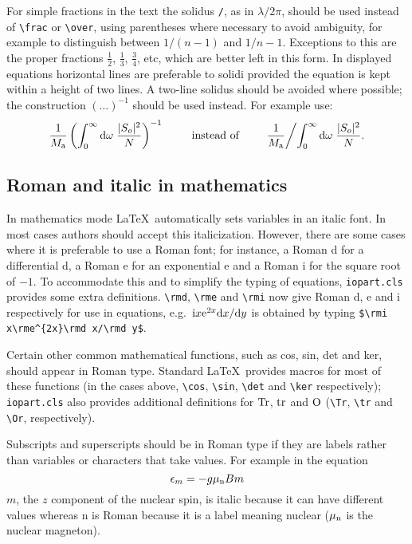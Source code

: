 \documentclass[12pt]{iopart}
\begin{document}
For simple fractions in the text the solidus \verb"/", as in 
$\lambda/2\pi$, should be used instead of \verb"\frac" or \verb"\over", 
using parentheses where necessary to avoid ambiguity, 
for example to distinguish between $1/(n-1)$ and $1/n-1$. Exceptions to 
this are the proper fractions $\frac12$, $\frac13$, $\frac34$, 
etc, which are better left in this form. In displayed equations 
horizontal lines are preferable to solidi provided the equation is 
kept within a height of two lines. A two-line solidus should be 
avoided where possible; the construction $(\ldots)^{-1}$ should be 
used instead. For example use:
\begin{equation*}
\frac{1}{M_{\rm a}}\left(\int^\infty_0{\rm d}
\omega\;\frac{|S_o|^2}{N}\right)^{-1}\qquad\mbox{instead of}\qquad
\frac{1}{M_{\rm a}}\biggl/\int^\infty_0{\rm d}
\omega\;\frac{|S_o|^2}{N}.
\end{equation*}

\subsection{Roman and italic in mathematics}
In mathematics mode \LaTeX\ automatically sets variables in an italic 
font. In most cases authors should accept this italicization. However, 
there are some cases where it is preferable to use a Roman font; for 
instance, a Roman d for a differential d, a Roman e 
for an exponential e and a Roman i for the square root of $-1$. To 
accommodate this and to simplify the  typing of equations, \verb"iopart.cls" provides
some extra definitions. \verb"\rmd", \verb"\rme" and \verb"\rmi" 
now give Roman d, e and i respectively for use in equations, 
e.g.\ $\rmi x\rme^{2x}\rmd x/\rmd y$ 
is obtained by typing \verb"$\rmi x\rme^{2x}\rmd x/\rmd y$". 
 

Certain other common mathematical functions, such as cos, sin, det and 
ker, should appear in Roman type. Standard \LaTeX\ provides macros for 
most of these functions 
(in the cases above, \verb"\cos", \verb"\sin", \verb"\det" and \verb"\ker" 
respectively); \verb"iopart.cls" also provides 
additional definitions for $\Tr$, $\tr$ and 
$\Or$ (\verb"\Tr", \verb"\tr" and \verb"\Or", respectively). 

Subscripts and superscripts should be in Roman type if they are labels 
rather than variables or characters that take values. For example in the 
equation
\[
\epsilon_m=-g\mu_{\rm n}Bm
\]
$m$, the $z$ component of the nuclear spin, is italic because it can have 
different values whereas n is Roman because it 
is a label meaning nuclear ($\mu_{\rm n}$ 
is the nuclear magneton).
\end{document}
